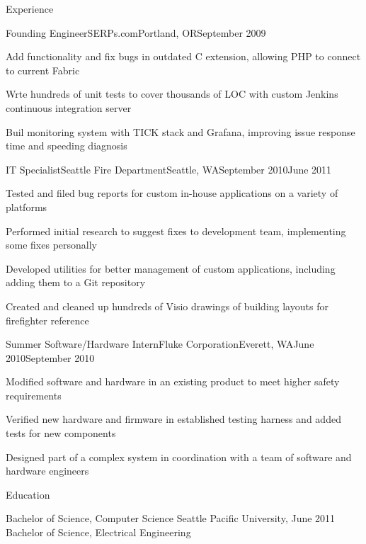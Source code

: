 \documentclass[letterpaper,12pt]{article}
\let\pt\pasttense
\begin{document}
\begin{paracol}{2}
\begin{res_section}{Experience}
\begin{res_experienceitem}{Founding Engineer}{SERPs.com}{Portland, OR}{September 2009}{{\pt[Present]{March 2017}}}
  \item Add\pt{ed} functionality and fix\pt{ed} bugs in outdated C extension, allowing PHP to connect to current Fabric
  \item Wr\pt[i]{o}te hundreds of unit tests to cover thousands of LOC with custom Jenkins continuous integration server
  \item Buil\pt[d]{t} monitoring system with TICK stack and Grafana, improving issue response time and speeding diagnosis
\end{res_experienceitem}
\begin{res_experienceitem}{IT Specialist}{Seattle Fire Department}{Seattle, WA}{September 2010}{June 2011}
  \item Tested and filed bug reports for custom in-house applications on a variety of platforms
  \item Performed initial research to suggest fixes to development team, implementing some fixes personally
  \item Developed utilities for better management of custom applications, including adding them to a Git repository
  \item Created and cleaned up hundreds of Visio drawings of building layouts for firefighter reference
\end{res_experienceitem}
\begin{res_experienceitem}{Summer Software/Hardware Intern}{Fluke Corporation}{Everett, WA}{June 2010}{September 2010}
  \item Modified software and hardware in an existing product to meet higher safety requirements
  \item Verified new hardware and firmware in established testing harness and added tests for new components
  \item Designed part of a complex system in coordination with a team of software and hardware engineers
\end{res_experienceitem}
\end{res_section}

\begin{res_section}{Education}
\begin{res_content}{Bachelor of Science, Computer Science
  \textnormal{
      \sffamily
      \normalsize
      \hfill
      Seattle Pacific University, June 2011}\\
  Bachelor of Science, Electrical Engineering
}
\end{res_content}
\end{res_section}

\end{paracol}
\end{document}
